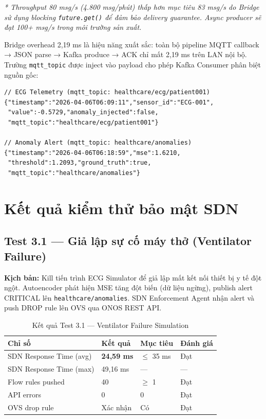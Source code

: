 \textit{* Throughput 80 msg/s (4.800 msg/phút) thấp hơn mục tiêu 83 msg/s do Bridge sử dụng blocking \texttt{future.get()} để đảm bảo delivery guarantee. Async producer sẽ đạt 100+ msg/s trong môi trường sản xuất.}

Bridge overhead 2,19 ms là hiệu năng xuất sắc: toàn bộ pipeline MQTT callback → JSON parse → Kafka produce → ACK chỉ mất 2,19 ms trên LAN nội bộ. Trường \texttt{mqtt\_topic} được inject vào payload cho phép Kafka Consumer phân biệt nguồn gốc:

\begin{lstlisting}[caption={Hai loại message trên Kafka topic healthcare-telemetry}]
// ECG Telemetry (mqtt_topic: healthcare/ecg/patient001)
{"timestamp":"2026-04-06T06:09:11","sensor_id":"ECG-001",
 "value":-0.5729,"anomaly_injected":false,
 "mqtt_topic":"healthcare/ecg/patient001"}

// Anomaly Alert (mqtt_topic: healthcare/anomalies)
{"timestamp":"2026-04-06T06:18:59","mse":1.6210,
 "threshold":1.2093,"ground_truth":true,
 "mqtt_topic":"healthcare/anomalies"}
\end{lstlisting}

\section{Kết quả kiểm thử bảo mật SDN}

\subsection{Test 3.1 — Giả lập sự cố máy thở (Ventilator Failure)}

\textbf{Kịch bản:} Kill tiến trình ECG Simulator để giả lập mất kết nối thiết bị y tế đột ngột. Autoencoder phát hiện MSE tăng đột biến (dữ liệu ngừng), publish alert CRITICAL lên \texttt{healthcare/anomalies}. SDN Enforcement Agent nhận alert và push DROP rule lên OVS qua ONOS REST API.

\begin{table}[htbp]
\caption{Kết quả Test 3.1 — Ventilator Failure Simulation}
\label{tab:test31}
\centering
\begin{tabular}{llll}
\toprule
\textbf{Chỉ số} & \textbf{Kết quả} & \textbf{Mục tiêu} & \textbf{Đánh giá} \\
\midrule
SDN Response Time (avg) & \textbf{24,59 ms} & $\leq$ 35 ms & Đạt \\
SDN Response Time (max) & 49,16 ms          & —            & — \\
Flow rules pushed        & 40                & $\geq$ 1     & Đạt \\
API errors               & 0                 & 0            & Đạt \\
OVS drop rule           & Xác nhận          & Có           & Đạt \\
\bottomrule
\end{tabular}
\end{table}

